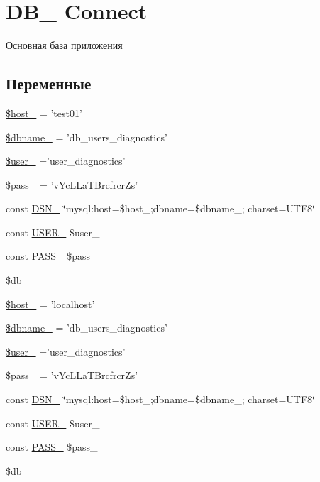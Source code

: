 \hypertarget{group___d_b__1}{\section{D\-B\-\_ Connect}
\label{group___d_b__1}
}


Основная база приложения  


\subsection*{Переменные}
\begin{DoxyCompactItemize}
\item 
\hyperlink{group___d_b__1_gaaef75b195cd712a695148aa5ea925ff6}{\$host\-\_} = 'test01'
\item 
\hyperlink{group___d_b__1_gab06b43f5844a74e58c253d1313d698c7}{\$dbname\-\_} = 'db\-\_\-users\-\_\-diagnostics'
\item 
\hyperlink{group___d_b__1_gaa3ccf4fb708509a71be03fc744a99d58}{\$user\-\_} ='user\-\_\-diagnostics'
\item 
\hyperlink{group___d_b__1_ga41dc8c99445163effebda89820668a55}{\$pass\-\_} = 'v\-Yc\-L\-La\-T\-Brcfrcr\-Zs'
\item 
const \hyperlink{group___d_b__1_ga8ed489df371f2fa8bb344efb8d65bc9c}{D\-S\-N\-\_} \char`\"{}mysql\-:host=\$host\-\_;dbname=\$dbname\-\_; charset=U\-T\-F8\char`\"{}
\item 
const \hyperlink{group___d_b__1_ga2b39766e2bf04cce22a7deee95879619}{U\-S\-E\-R\-\_} \$user\-\_
\item 
const \hyperlink{group___d_b__1_ga5a1b531167aa8e2f89c1f9bf9b32ddf3}{P\-A\-S\-S\-\_} \$pass\-\_
\item 
\hyperlink{group___d_b__1_ga76fa04d1db973b91108c60680e5b956f}{\$db\-\_}
\item 
\hyperlink{group___d_b__1_gaaef75b195cd712a695148aa5ea925ff6}{\$host\-\_} = 'localhost'
\item 
\hyperlink{group___d_b__1_gab06b43f5844a74e58c253d1313d698c7}{\$dbname\-\_} = 'db\-\_\-users\-\_\-diagnostics'
\item 
\hyperlink{group___d_b__1_gaa3ccf4fb708509a71be03fc744a99d58}{\$user\-\_} ='user\-\_\-diagnostics'
\item 
\hyperlink{group___d_b__1_ga41dc8c99445163effebda89820668a55}{\$pass\-\_} = 'v\-Yc\-L\-La\-T\-Brcfrcr\-Zs'
\item 
const \hyperlink{group___d_b__1_ga8ed489df371f2fa8bb344efb8d65bc9c}{D\-S\-N\-\_} \char`\"{}mysql\-:host=\$host\-\_;dbname=\$dbname\-\_; charset=U\-T\-F8\char`\"{}
\item 
const \hyperlink{group___d_b__1_ga2b39766e2bf04cce22a7deee95879619}{U\-S\-E\-R\-\_} \$user\-\_
\item 
const \hyperlink{group___d_b__1_ga5a1b531167aa8e2f89c1f9bf9b32ddf3}{P\-A\-S\-S\-\_} \$pass\-\_
\item 
\hyperlink{group___d_b__1_ga76fa04d1db973b91108c60680e5b956f}{\$db\-\_}
\end{DoxyCompactItemize}


